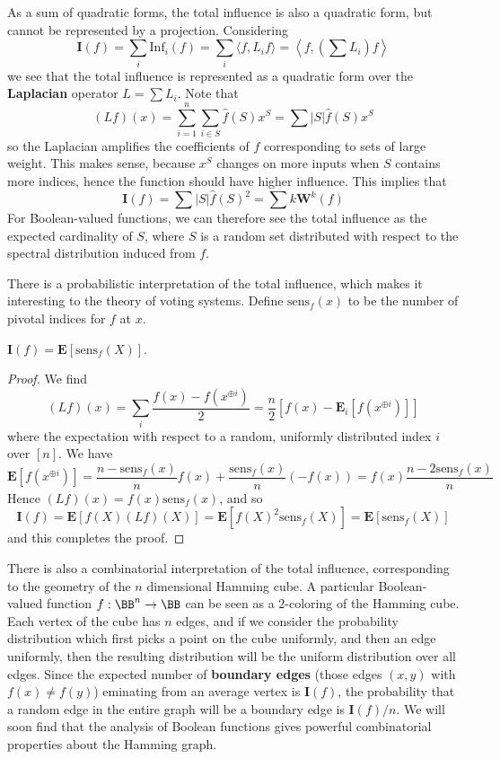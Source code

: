 As a sum of quadratic forms, the total influence is also a quadratic form, but cannot be represented by a projection. Considering
%
\[ \mathbf{I}(f) = \sum_i \text{Inf}_i(f) = \sum_i \langle f, L_i f \rangle = \left\langle f, \left( \sum L_i \right) f \right\rangle \]
%
we see that the total influence is represented as a quadratic form over the {\bf Laplacian} operator $L = \sum L_i$. Note that
%
\[ (Lf)(x) = \sum_{i = 1}^n \sum_{i \in S} \widehat{f}(S) x^S = \sum |S| \widehat{f}(S) x^S \]
%
so the Laplacian amplifies the coefficients of $f$ corresponding to sets of large weight. This makes sense, because $x^S$ changes on more inputs when $S$ contains more indices, hence the function should have higher influence. This implies that
%
\[ \mathbf{I}(f) = \sum |S| \widehat{f}(S)^2 = \sum k \mathbf{W}^k(f) \]
%
For Boolean-valued functions, we can therefore see the total influence as the expected cardinality of $S$, where $S$ is a random set distributed with respect to the spectral distribution induced from $f$.

There is a probabilistic interpretation of the total influence, which makes it interesting to the theory of voting systems. Define $\text{sens}_f(x)$ to be the number of pivotal indices for $f$ at $x$.

\begin{theorem} $\mathbf{I}(f) = \mathbf{E}[\text{sens}_f(X)]$. \end{theorem}
\begin{proof}
    We find
    \[ (Lf)(x) = \sum_i \frac{f(x) - f(x^{\oplus i})}{2} = \frac{n}{2} [f(x) - \mathbf{E}_i[f(x^{\oplus i})]] \]
    where the expectation with respect to a random, uniformly distributed index $i$ over $[n]$. We have
    \[ \mathbf{E}[f(x^{\oplus i})] = \frac{n - \text{sens}_f(x)}{n} f(x) + \frac{\text{sens}_f(x)}{n} (-f(x)) = f(x) \frac{n - 2 \text{sens}_f(x)}{n} \]
    Hence $(Lf)(x) = f(x) \text{sens}_f(x)$, and so
    \[ \mathbf{I}(f) = \mathbf{E}[f(X) (Lf)(X)] = \mathbf{E}[f(X)^2 \text{sens}_f(X)] = \mathbf{E}[\text{sens}_f(X)] \]
    and this completes the proof.
\end{proof}

There is also a combinatorial interpretation of the total influence, corresponding to the geometry of the $n$ dimensional Hamming cube. A particular Boolean-valued function $f: \BB^n \to \BB$ can be seen as a 2-coloring of the Hamming cube. Each vertex of the cube has $n$ edges, and if we consider the probability distribution which first picks a point on the cube uniformly, and then an edge uniformly, then the resulting distribution will be the uniform distribution over all edges. Since the expected number of {\bf boundary edges} (those edges $(x,y)$ with $f(x) \neq f(y)$) eminating from an average vertex is $\mathbf{I}(f)$, the probability that a random edge in the entire graph will be a boundary edge is $\mathbf{I}(f)/n$. We will soon find that the analysis of Boolean functions gives powerful combinatorial properties about the Hamming graph.

